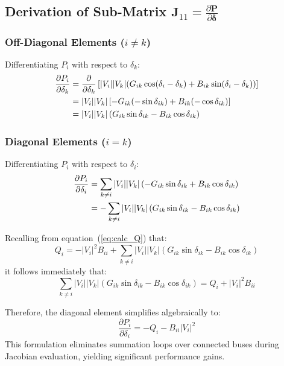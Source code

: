 \documentclass[12pt,a4paper,oneside]{report}
\begin{document}
\subsection{Derivation of Sub-Matrix $\mathbf{J}_{11} = \frac{\partial \mathbf{P}}{\partial \boldsymbol{\delta}}$}

\subsubsection{Off-Diagonal Elements ($i \neq k$)}
Differentiating $P_i$ with respect to $\delta_k$:
\begin{align}
\frac{\partial P_i}{\partial \delta_k} &= \frac{\partial}{\partial \delta_k} \left[ |V_i| |V_k| (G_{ik} \cos(\delta_i - \delta_k) + B_{ik} \sin(\delta_i - \delta_k)) \right] \notag \\
&= |V_i| |V_k| \left[ -G_{ik} (-\sin\delta_{ik}) + B_{ik} (-\cos\delta_{ik}) \right] \notag \\
&= |V_i| |V_k| \left( G_{ik} \sin\delta_{ik} - B_{ik} \cos\delta_{ik} \right)
\label{eq:j11_off}
\end{align}

\subsubsection{Diagonal Elements ($i = k$)}
Differentiating $P_i$ with respect to $\delta_i$:
\begin{align}
\frac{\partial P_i}{\partial \delta_i} &= \sum_{k \neq i} |V_i| |V_k| \left( -G_{ik} \sin\delta_{ik} + B_{ik} \cos\delta_{ik} \right) \notag \\
&= - \sum_{k \neq i} |V_i| |V_k| \left( G_{ik} \sin\delta_{ik} - B_{ik} \cos\delta_{ik} \right)
\end{align}

Recalling from equation~(\ref{eq:calc_Q}) that:
\begin{equation}
Q_i = -|V_i|^2 B_{ii} + \sum_{k \neq i} |V_i| |V_k| \left( G_{ik} \sin\delta_{ik} - B_{ik} \cos\delta_{ik} \right)
\end{equation}
it follows immediately that:
\begin{equation}
\sum_{k \neq i} |V_i| |V_k| \left( G_{ik} \sin\delta_{ik} - B_{ik} \cos\delta_{ik} \right) = Q_i + |V_i|^2 B_{ii}
\end{equation}

Therefore, the diagonal element simplifies algebraically to:
\begin{equation}
\frac{\partial P_i}{\partial \delta_i} = -Q_i - B_{ii} |V_i|^2
\label{eq:j11_diag}
\end{equation}
This formulation eliminates summation loops over connected buses during Jacobian evaluation, yielding significant performance gains.
\end{document}
